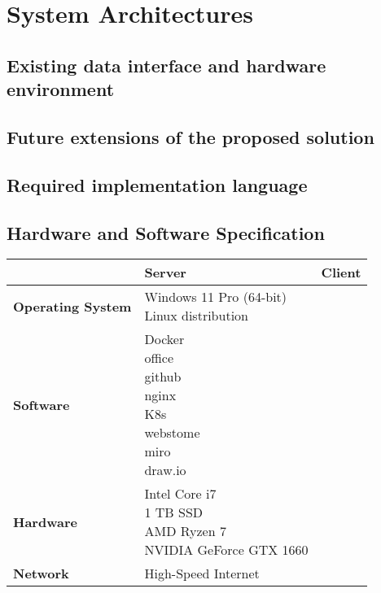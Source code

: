 \section{System Architectures}

\subsection{Existing data interface and hardware environment}
\subsection{Future extensions of the proposed solution}
\subsection{Required implementation language}
\subsection{Hardware and Software Specification}

\begin{table}[h]
    \begin{tabularx}{\textwidth}{|l|X|X|}
    \hline
    \textbf{} & \textbf{Server} & \textbf{Client} \\
    \hline
    \textbf{Operating System} &
    \makecell[l]{
        Windows 11 Pro (64-bit) \\
        Linux distribution
    } &
    \\
    \hline
    \textbf{Software} &
    \makecell[l]{
        Docker \\
        office \\
        github \\
        nginx \\
        K8s \\
        webstome\\
        miro \\
        draw.io
    } &
    \\
    \hline
    \textbf{Hardware} &
    \makecell[l]{
        Intel Core i7 \\
        1 TB SSD \\
        AMD Ryzen 7\\
        NVIDIA GeForce GTX 1660
    } &
    \\
    \hline
    \textbf{Network} &
    High-Speed Internet &
    \\
    \hline
    \end{tabularx}
\end{table}
